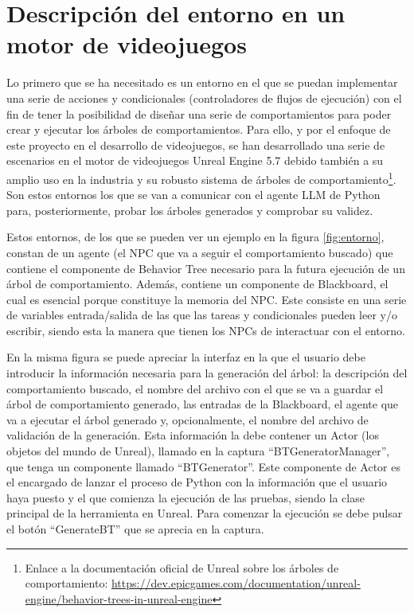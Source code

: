 \section{Descripción del entorno en un motor de videojuegos}
\label{sec:DescripcionEntorno}

Lo primero que se ha necesitado es un entorno en el que se puedan implementar una serie de acciones y condicionales (controladores de flujos de ejecución) con el fin de tener la posibilidad de diseñar una serie de comportamientos para poder crear y ejecutar los árboles de comportamientos.
Para ello, y por el enfoque de este proyecto en el desarrollo de videojuegos, se han desarrollado una serie de escenarios en el motor de videojuegos Unreal Engine 5.7 debido también a su amplio uso en la industria y su robusto sistema de árboles de comportamiento\footnote{Enlace a la documentación oficial de Unreal sobre los árboles de comportamiento: \url{https://dev.epicgames.com/documentation/unreal-engine/behavior-trees-in-unreal-engine}}.
Son estos entornos los que se van a comunicar con el agente LLM de Python para, posteriormente, probar los árboles generados y comprobar su validez.

Estos entornos, de los que se pueden ver un ejemplo en la figura \ref{fig:entorno}, constan de un agente (el NPC que va a seguir el comportamiento buscado) que contiene el componente de Behavior Tree necesario para la futura ejecución de un árbol de comportamiento.
Además, contiene un componente de Blackboard, el cual es esencial porque constituye la memoria del NPC.
Este consiste en una serie de variables entrada/salida de las que las tareas y condicionales pueden leer y/o escribir, siendo esta la manera que tienen los NPCs de interactuar con el entorno.

En la misma figura se puede apreciar la interfaz en la que el usuario debe introducir la información necesaria para la generación del árbol: la descripción del comportamiento buscado, el nombre del archivo con el que se va a guardar el árbol de comportamiento generado, las entradas de la Blackboard, el agente que va a ejecutar el árbol generado y, opcionalmente, el nombre del archivo de validación de la generación.
Esta información la debe contener un Actor (los objetos del mundo de Unreal), llamado en la captura ``BTGeneratorManager'', que tenga un componente llamado ``BTGenerator''.
Este componente de Actor es el encargado de lanzar el proceso de Python con la información que el usuario haya puesto y el que comienza la ejecución de las pruebas, siendo la clase principal de la herramienta en Unreal.
Para comenzar la ejecución se debe pulsar el botón ``GenerateBT'' que se aprecia en la captura.

